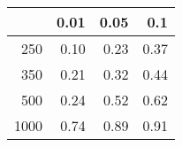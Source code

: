 % 
\begin{tabular}{rrrr}
  \hline
 & 0.01 & 0.05 & 0.1 \\ 
  \hline
250 & 0.10 & 0.23 & 0.37 \\ 
  350 & 0.21 & 0.32 & 0.44 \\ 
  500 & 0.24 & 0.52 & 0.62 \\ 
  1000 & 0.74 & 0.89 & 0.91 \\ 
   \hline
\end{tabular}

